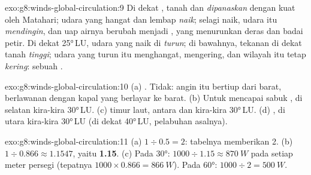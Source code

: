 \begin{solution}{exo:g8:winds-global-circulation:9}
Di dekat , tanah dan  \emph{dipanaskan} dengan kuat oleh
Matahari; udara yang hangat dan lembap \emph{naik}; selagi naik, udara itu
\emph{mendingin}, dan uap airnya berubah menjadi \emph{}, yang
menurunkan  deras dan badai petir. Di dekat \ang{25}\,LU, udara yang
naik di  \emph{turun}; di bawahnya, tekanan di dekat tanah
\emph{tinggi}; udara yang turun itu menghangat,  mengering, dan
wilayah itu tetap \emph{kering}: sebuah .
\end{solution}

\begin{solution}{exo:g8:winds-global-circulation:10}
(a) . Tidak: angin itu bertiup dari barat, berlawanan dengan
kapal yang berlayar ke barat. (b) Untuk mencapai sabuk , di
selatan kira-kira \ang{30}\,LU. (c)  timur laut, antara
 dan kira-kira \ang{30}\,LU. (d) , di utara
kira-kira \ang{30}\,LU (di dekat \ang{40}\,LU,  pelabuhan asalnya).
\end{solution}

\begin{solution}{exo:g8:winds-global-circulation:11}
(a) $1 \div 0.5 = 2$: tabelnya memberikan 2. (b) $1 \div 0.866 \approx
1.1547$, yaitu \textbf{1.15}. (c) Pada \ang{30}: $1000 \div 1.15 \approx
\qty{870}{W}$ pada setiap meter persegi (tepatnya $1000 \times 0.866 =
\qty{866}{W}$). Pada \ang{60}: $1000 \div 2 = \qty{500}{W}$.
\end{solution}

